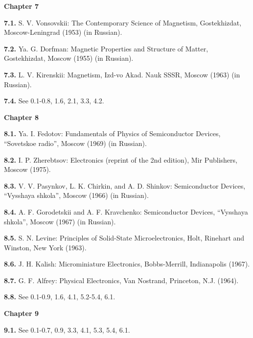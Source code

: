 {\large{\sffamily\bfseries Chapter 7}}

{\small

\textbf{7.1.} S. V. Vonsovskii: The Contemporary Science of Magnetism, Gostekhizdat, Moscow-Leningrad (1953) (in Russian).

\textbf{7.2.} Ya. G. Dorfman: Magnetic Properties and Structure of Matter, Gostekhizdat, Moscow (1955) (in Russian).

\textbf{7.3.} L. V. Kirenskii: Magnetism, Izd-vo Akad. Nauk SSSR, Moscow (1963) (in Russian).

\textbf{7.4.} See 0.1-0.8, 1.6, 2.1, 3.3, 4.2.

}

\bigskip

{\large{\sffamily\bfseries Chapter 8}}

{\small

\textbf{8.1.} Ya. I. Fedotov: Fundamentals of Physics of Semiconductor Devices, ``Sovetskoe radio'', Moscow (1969) (in Russian).

\textbf{8.2.} I. P. Zherebtsov: Electronics (reprint of the 2nd edition), Mir Publishers, Moscow (1975).

\textbf{8.3.} V. V. Pasynkov, L. K. Chirkin, and A. D. Shinkov: Semiconductor Devices, ``Vysshaya shkola'', Moscow (1966) (in Russian).

\textbf{8.4.} A. F. Gorodetskii and A. F. Kravchenko: Semiconductor Devices, ``Vysshaya shkola'', Moscow (1967) (in Russian).

\textbf{8.5.} S. N. Levine: Principles of Solid-State Microelectronics, Holt, Rinehart and Winston, New York (1963).

\textbf{8.6.} J. H. Kalish: Microminiature Electronics, Bobbs-Merrill, Indianapolis (1967).

\textbf{8.7.} G. F. Alfrey: Physical Electronics, Van Nostrand, Princeton, N.J. (1964).

\textbf{8.8.} See 0.1-0.9, 1.6, 4.1, 5.2-5.4, 6.1.

}

\bigskip

{\large{\sffamily\bfseries Chapter 9}}

{\small

\textbf{9.1.} See 0.1-0.7, 0.9, 3.3, 4.1, 5.3, 5.4, 6.1.

}

